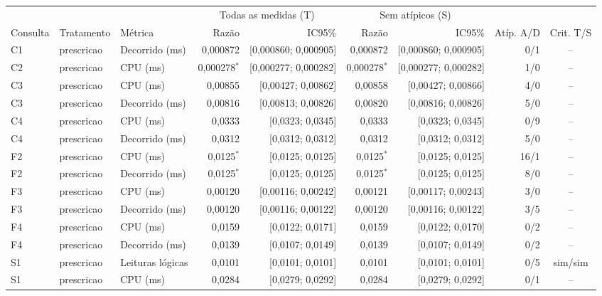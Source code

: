 {\scriptsize\setlength{\tabcolsep}{4pt}
\begin{tabular}{lllrrrrrc}
\toprule
 &  &  & \multicolumn{2}{c}{Todas as medidas (T)} & \multicolumn{2}{c}{Sem atípicos (S)} &  &  \\
\cmidrule(lr){4-5}\cmidrule(lr){6-7}
Consulta & Tratamento & Métrica & Razão & IC95\% & Razão & IC95\% & Atíp. A/D & Crit. T/S \\
\midrule
C1 & prescricao & Decorrido (ms) & 0,000872 & [0,000860; 0,000905] & 0,000872 & [0,000860; 0,000905] & 0/1 & -- \\
C2 & prescricao & CPU (ms) & 0,000278$^{*}$ & [0,000277; 0,000282] & 0,000278$^{*}$ & [0,000277; 0,000282] & 1/0 & -- \\
C3 & prescricao & CPU (ms) & 0,00855 & [0,00427; 0,00862] & 0,00858 & [0,00427; 0,00866] & 4/0 & -- \\
C3 & prescricao & Decorrido (ms) & 0,00816 & [0,00813; 0,00826] & 0,00820 & [0,00816; 0,00826] & 5/0 & -- \\
C4 & prescricao & CPU (ms) & 0,0333 & [0,0323; 0,0345] & 0,0333 & [0,0323; 0,0345] & 0/9 & -- \\
C4 & prescricao & Decorrido (ms) & 0,0312 & [0,0312; 0,0312] & 0,0312 & [0,0312; 0,0312] & 5/0 & -- \\
F2 & prescricao & CPU (ms) & 0,0125$^{*}$ & [0,0125; 0,0125] & 0,0125$^{*}$ & [0,0125; 0,0125] & 16/1 & -- \\
F2 & prescricao & Decorrido (ms) & 0,0125$^{*}$ & [0,0125; 0,0125] & 0,0125$^{*}$ & [0,0125; 0,0125] & 8/0 & -- \\
F3 & prescricao & CPU (ms) & 0,00120 & [0,00116; 0,00242] & 0,00121 & [0,00117; 0,00243] & 3/0 & -- \\
F3 & prescricao & Decorrido (ms) & 0,00120 & [0,00116; 0,00122] & 0,00120 & [0,00116; 0,00122] & 3/5 & -- \\
F4 & prescricao & CPU (ms) & 0,0159 & [0,0122; 0,0171] & 0,0159 & [0,0122; 0,0170] & 0/2 & -- \\
F4 & prescricao & Decorrido (ms) & 0,0139 & [0,0107; 0,0149] & 0,0139 & [0,0107; 0,0149] & 0/2 & -- \\
S1 & prescricao & Leituras lógicas & 0,0101 & [0,0101; 0,0101] & 0,0101 & [0,0101; 0,0101] & 0/5 & sim/sim \\
S1 & prescricao & CPU (ms) & 0,0284 & [0,0279; 0,0292] & 0,0284 & [0,0279; 0,0292] & 0/1 & -- \\

\end{tabular}}
